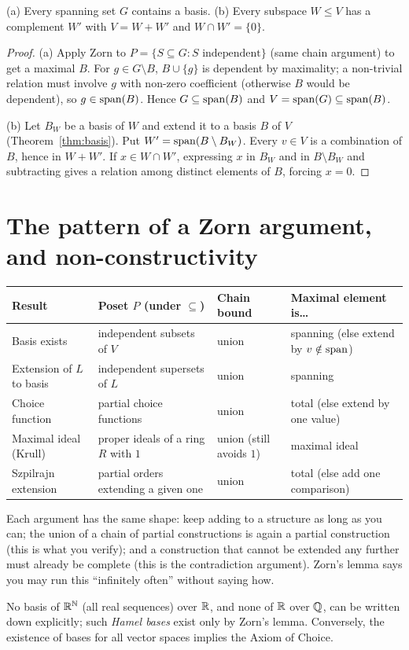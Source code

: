 \begin{corollary}\label{cor:basis-consequences}
	(a) Every spanning set $G$ contains a basis. (b) Every subspace $W\le V$ has a complement $W'$ with $V=W+W'$ and $W\cap W'=\{0\}$.
\end{corollary}
\begin{proof}
	(a) Apply Zorn to $P=\{S\subseteq G:S\text{ independent}\}$ (same chain argument) to get a maximal $B$. For $g\in G\setminus B$, $B\cup\{g\}$ is dependent by maximality; a non-trivial relation must involve $g$ with non-zero coefficient (otherwise $B$ would be dependent), so $g\in\operatorname{span}(B)$. Hence $G\subseteq\operatorname{span}(B)$ and $V=\operatorname{span}(G)\subseteq\operatorname{span}(B)$.
	
	(b) Let $B_W$ be a basis of $W$ and extend it to a basis $B$ of $V$ (Theorem~\ref{thm:basis}). Put $W'=\operatorname{span}(B\setminus B_W)$. Every $v\in V$ is a combination of $B$, hence in $W+W'$. If $x\in W\cap W'$, expressing $x$ in $B_W$ and in $B\setminus B_W$ and subtracting gives a relation among distinct elements of $B$, forcing $x=0$.
\end{proof}

\section{The pattern of a Zorn argument, and non-constructivity}

\begin{center}
	\begin{tabular}{@{}p{3.3cm}p{3.3cm}p{2.6cm}p{5.4cm}@{}}
		\toprule
		\textbf{Result} & \textbf{Poset $P$ (under $\subseteq$)} & \textbf{Chain bound} & \textbf{Maximal element is\ldots}\\
		\midrule
		Basis exists & independent subsets of $V$ & union & spanning (else extend by $v\notin\operatorname{span}$)\\
		Extension of $L$ to basis & independent supersets of $L$ & union & spanning\\
		Choice function & partial choice functions & union & total (else extend by one value)\\
		Maximal ideal (Krull) & proper ideals of a ring $R$ with $1$ & union (still avoids $1$) & maximal ideal\\
		Szpilrajn extension & partial orders extending a given one & union & total (else add one comparison)\\
		\bottomrule
	\end{tabular}
\end{center}

\begin{intuition}
	Each argument has the same shape: keep adding to a structure as long as you can; the union of a chain of partial constructions is again a partial construction (this is what you verify); and a construction that cannot be extended any further must already be complete (this is the contradiction argument). Zorn's lemma says you may run this ``infinitely often'' without saying how.
\end{intuition}

\begin{remark}
	No basis of $\mathbb{R}^{\mathbb{N}}$ (all real sequences) over $\mathbb{R}$, and none of $\mathbb{R}$ over $\mathbb{Q}$, can be written down explicitly; such \emph{Hamel bases} exist only by Zorn's lemma. Conversely, the existence of bases for all vector spaces implies the Axiom of Choice.
\end{remark}